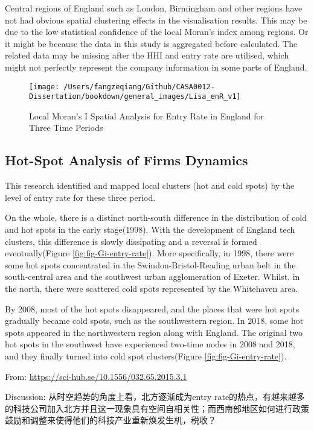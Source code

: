 \documentclass[
  12pt,
  oneside]{book}
\begin{document}
Central regions of England such as London, Birmingham and other regions have not had obvious spatial clustering effects in the visualisation results. This may be due to the low statistical confidence of the local Moran's index among regions. Or it might be because the data in this study is aggregated before calculated. The related data may be missing after the HHI and entry rate are utilised, which might not perfectly represent the company information in some parts of England.

\begin{figure}
\texttt{[image: /Users/fangzeqiang/Github/CASA0012-Dissertation/bookdown/general\_images/Lisa\_enR\_v1]} \caption{Local Moran's I Spatial Analysis for Entry Rate in England for Three Time Periods}\label{fig:fig-lisa-entry-rate}
\end{figure}

\hypertarget{hot-spot-analysis-of-firms-dynamics}{%
\subsection{Hot-Spot Analysis of Firms Dynamics}\label{hot-spot-analysis-of-firms-dynamics}}

This research identified and mapped local clusters (hot and cold spots) by the level of entry rate for these three period.

On the whole, there is a distinct north-south difference in the distribution of cold and hot spots in the early stage(1998). With the development of England tech clusters, this difference is slowly dissipating and a reversal is formed eventually(Figure \ref{fig:fig-Gi-entry-rate}). More specifically, in 1998, there were some hot spots concentrated in the Swindon-Bristol-Reading urban belt in the south-central area and the southwest urban agglomeration of Exeter. Whilst, in the north, there were scattered cold spots represented by the Whitehaven area.

By 2008, most of the hot spots disappeared, and the places that were hot spots gradually became cold spots, such as the southwestern region. In 2018, some hot spots appeared in the northwestern region along with England. The original two hot spots in the southwest have experienced two-time nodes in 2008 and 2018, and they finally turned into cold spot clusters(Figure \ref{fig:fig-Gi-entry-rate}).

From: \url{https://sci-hub.se/10.1556/032.65.2015.3.1}

Discussion: 从时空趋势的角度上看，北方逐渐成为entry rate的热点，有越来越多的科技公司加入北方并且这一现象具有空间自相关性；而西南部地区如何进行政策鼓励和调整来使得他们的科技产业重新焕发生机，税收？
\end{document}
